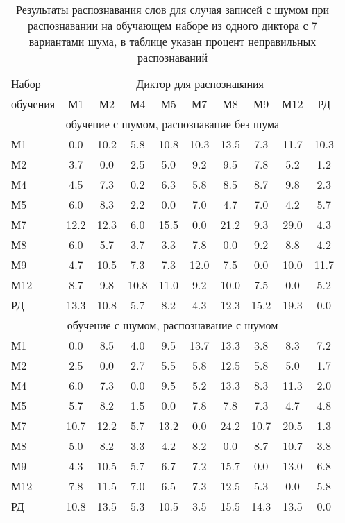 \begin{table}[h]
	\centering
	\caption{Результаты распознавания слов для случая записей с шумом при распознавании на обучающем наборе из одного диктора с 7 вариантами шума, в таблице указан процент неправильных распознаваний}
	\label{tab:cnn_7noise_1dictor}
	\begin{tabular}{| l | c | c | c | c | c | c | c | c | c |}
		\hline
		Набор & \multicolumn{9}{c|}{Диктор для распознавания} \\
		\hhline{~---------}
		обучения\phantom{00} & \phantom{0}М1\phantom{0} & \phantom{0}М2\phantom{0} & \phantom{0}М4\phantom{0} & \phantom{0}М5\phantom{0} & \phantom{0}М7\phantom{0} & \phantom{0}М8\phantom{0} & \phantom{0}М9\phantom{0} & \phantom{0}М12\phantom{0} & \phantom{0}РД\phantom{0} \\
		\hline
		\multicolumn{10}{|c|}{обучение с шумом, распознавание без шума} \\
		\hline
		М1		 &  0.0 & 10.2 &  5.8 & 10.8 & 10.3 & 13.5 &  7.3 & 11.7 & 10.3 \\
		М2		 &  3.7 &  0.0 &  2.5 &  5.0 &  9.2 &  9.5 &  7.8 &  5.2 &  1.2 \\
		М4		 &  4.5 &  7.3 &  0.2 &  6.3 &  5.8 &  8.5 &  8.7 &  9.8 &  2.3 \\
		М5		 &  6.0 &  8.3 &  2.2 &  0.0 &  7.0 &  4.7 &  7.0 &  4.2 &  5.7 \\
		М7		 & 12.2 & 12.3 &  6.0 & 15.5 &  0.0 & 21.2 &  9.3 & 29.0 &  4.3 \\
		М8		 &  6.0 &  5.7 &  3.7 &  3.3 &  7.8 &  0.0 &  9.2 &  8.8 &  4.2 \\
		М9		 &  4.7 & 10.5 &  7.3 &  7.3 & 12.0 &  7.5 &  0.0 & 10.0 & 11.7 \\
		М12		 &  8.7 &  9.8 & 10.8 & 11.0 &  9.2 & 10.0 &  7.5 &  0.0 &  5.2 \\
		РД		 & 13.3 & 10.8 &  5.7 &  8.2 &  4.3 & 12.3 & 15.2 & 19.3 &  0.0 \\
		\hline
		\multicolumn{10}{|c|}{обучение с шумом, распознавание с шумом} \\
		\hline
		М1		 &  0.0 &  8.5 &  4.0 &  9.5 & 13.7 & 13.3 &  3.8 &  8.3 &  7.2 \\
		М2		 &  2.5 &  0.0 &  2.7 &  5.5 &  5.8 & 12.5 &  5.8 &  5.0 &  1.7 \\
		М4		 &  6.0 &  7.3 &  0.0 &  9.5 &  5.2 & 13.3 &  8.3 & 11.3 &  2.0 \\
		М5		 &  5.7 &  8.2 &  1.5 &  0.0 &  7.8 &  7.8 &  7.3 &  4.7 &  4.8 \\
		М7		 & 10.7 & 12.2 &  5.7 & 13.2 &  0.0 & 24.2 & 10.7 & 20.5 &  1.3 \\
		М8		 &  5.0 &  8.2 &  3.3 &  4.2 &  8.2 &  0.0 &  8.7 & 10.7 &  3.8 \\
		М9		 &  4.3 & 10.5 &  5.7 &  6.7 &  7.2 & 15.7 &  0.0 & 13.0 &  6.8 \\
		М12		 &  7.8 & 11.5 &  7.0 &  6.5 &  7.3 & 12.5 &  5.3 &  0.0 &  5.8 \\
		РД		 & 10.8 & 13.5 &  5.3 & 10.5 &  3.5 & 15.5 & 14.3 & 13.5 &  0.0 \\
		\hline
	\end{tabular}
\end{table}

